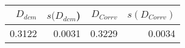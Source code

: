 \begin{tabular}{rrrr}
\toprule
$D_{dcm}$ & $s(D_{dcm}$) & $D_{Corrv}$ & $s(D_{Corrv})$ \\
\midrule
0.3122 & 0.0031 & 0.3229 & 0.0034 \\
\bottomrule
\end{tabular}
